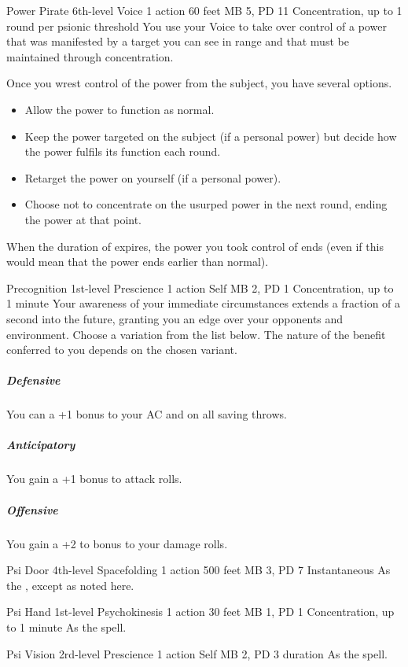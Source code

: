 \DndPowerHeader%
  {Power Pirate}
  {6th-level Voice}
  {1 action}
  {60 feet}
  {MB 5, PD 11}
  {Concentration, up to 1 round per psionic threshold}
  You use your Voice to take over control of a power
  that was manifested by a target you can see in range
  and that must be maintained through concentration.

  Once you wrest control of the power from the subject,
  you have several options.
  \begin{itemize}
    \item Allow the power to function as normal.
    \item Keep the power targeted on the subject
          (if a personal power) but decide how the power
          fulfils its function each round.
    \item Retarget the power on yourself (if a personal power).
    \item Choose not to concentrate on the usurped power
            in the next round, ending the power at that point.
  \end{itemize}
When the duration of  expires,
the power you took control of ends
(even if this would mean that the power ends earlier than normal).

\DndPowerHeader%
  {Precognition}
  {1st-level Prescience}
  {1 action}
  {Self}
  {MB 2, PD 1}
  {Concentration, up to 1 minute}
Your awareness of your immediate circumstances extends
a fraction of a second into the future,
granting you an edge over your opponents and environment.
Choose a variation from the list below.
The nature of the benefit conferred to you
depends on the chosen variant.
\subparagraph{Defensive}
  You can a +1 bonus to your AC and on all saving throws.
\subparagraph{Anticipatory}
  You gain a +1 bonus to attack rolls.
\subparagraph{Offensive}
  You gain a +2 to bonus to your damage rolls.

\DndPowerHeader%
  {Psi Door}
  {4th-level Spacefolding}
  {1 action}
  {500 feet}
  {MB 3, PD 7}
  {Instantaneous}
As the , except as noted here.

\DndPowerHeader%
  {Psi Hand}
  {1st-level Psychokinesis}
  {1 action}
  {30 feet}
  {MB 1, PD 1}
  {Concentration, up to 1 minute}
As the  spell.

\DndPowerHeader%
  {Psi Vision}
  {2rd-level Prescience}
  {1 action}
  {Self}
  {MB 2, PD 3}
  {duration}
As the  spell.


